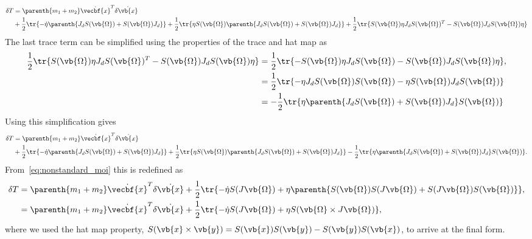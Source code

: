 \begin{align*}
    \delta T &= \parenth{m_1 + m_2} \dot{\vecbf{x}}^T \delta \dot{\vb{x}} \\
    & + \frac{1}{2} \tr{-\dot{\eta} \parenth{J_d S(\vb{\Omega}) + S(\vb{\Omega}) J_d}} + \frac{1}{2} \tr{\eta S(\vb{\Omega}) \parenth{J_d S(\vb{\Omega}) + S(\vb{\Omega}) J_d}} + \frac{1}{2} \tr{ S(\vb{\Omega}) \eta J_d S(\vb{\Omega})^T - S(\vb{\Omega}) J_d S(\vb{\Omega}) \eta}
\end{align*}
The last trace term can be simplified using the properties of the trace and hat map as
\begin{align*}
    \frac{1}{2} \tr{ S(\vb{\Omega}) \eta J_d S(\vb{\Omega})^T - S(\vb{\Omega}) J_d S(\vb{\Omega}) \eta} &= \frac{1}{2} \tr{ - S(\vb{\Omega}) \eta J_d S(\vb{\Omega}) - S(\vb{\Omega}) J_d S(\vb{\Omega}) \eta} , \\
    &= \frac{1}{2} \tr{ -  \eta J_d S(\vb{\Omega}) S(\vb{\Omega}) - \eta S(\vb{\Omega}) J_d S(\vb{\Omega}) } \\
    &= -\frac{1}{2} \tr{\eta \parenth{J_d S(\vb{\Omega}) +S(\vb{\Omega}) J_d }S(\vb{\Omega})}
\end{align*}
Using this simplification gives
\begin{align*}
    \delta T &= \parenth{m_1 + m_2} \dot{\vecbf{x}}^T \delta \dot{\vb{x}} \\
    & + \frac{1}{2} \tr{-\dot{\eta} \parenth{J_d S(\vb{\Omega}) + S(\vb{\Omega}) J_d}} + \frac{1}{2} \tr{\eta S(\vb{\Omega}) \parenth{J_d S(\vb{\Omega}) + S(\vb{\Omega}) J_d}} - \frac{1}{2} \tr{ \eta \parenth{J_d S(\vb{\Omega}) +S(\vb{\Omega}) J_d }S(\vb{\Omega})} .
\end{align*}
From~\cref{eq:nonstandard_moi} this is redefined as
\begin{align}\label{eq:kinetic_energy_variation_final}
    \delta T &= \parenth{m_1 + m_2} \dot{\vecbf{x}}^T \delta \dot{\vb{x}} + \frac{1}{2} \tr{-\dot \eta S(J \vb{\Omega}) + \eta \parenth{ S(\vb{\Omega}) S(J \vb{\Omega}) + S(J \vb{\Omega}) S(\vb{\Omega})} } , \nonumber\\
    &=  \parenth{m_1 + m_2} \dot{\vecbf{x}}^T \delta \dot{\vb{x}} + \frac{1}{2} \tr{ - \dot{\eta} S(J \vb{\Omega}) + \eta S(\vb{\Omega} \times J \vb{\Omega})} , 
\end{align}
where we used the hat map property, \( S(\vb{x} \times \vb{y}) = S(\vb{x})S(\vb{y}) - S(\vb{y})S(\vb{x}) \), to arrive at the final form.


